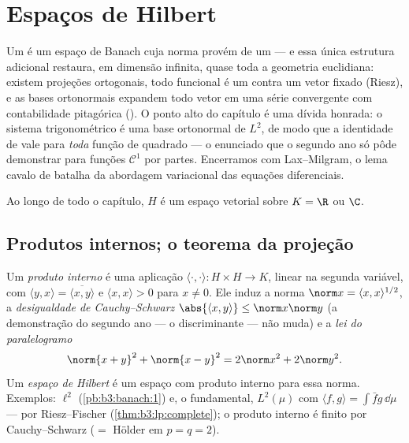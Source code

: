 \chapter{Espaços de Hilbert}\label{ch:b3:hilbert}

Um  é um espaço de Banach cuja norma provém de um
 --- e essa única estrutura adicional restaura, em
dimensão infinita, quase toda a geometria euclidiana: existem projeções
ortogonais, todo funcional  é um  contra um
vetor fixado (Riesz), e as bases ortonormais expandem todo vetor em uma
série convergente com contabilidade pitagórica (). O ponto alto
do capítulo é uma dívida honrada: o sistema trigonométrico é uma base
ortonormal de $L^2$, de modo que a identidade de  vale para
\emph{toda} função de quadrado  --- o enunciado que o segundo
ano só pôde demonstrar para funções $\mathcal C^1$ por partes. Encerramos com
Lax--Milgram, o lema cavalo de batalha da abordagem variacional das
equações diferenciais.

Ao longo de todo o capítulo, $H$ é um espaço vetorial sobre
$K = \R$ ou $\C$.

\section{Produtos internos; o teorema da projeção}

\begin{definition}\label{def:b3:hilbert:inner}
Um \emph{produto interno} é uma aplicação $\langle
\cdot,\cdot\rangle \colon H\times H \to K$,
linear na segunda variável, com $\langle y, x\rangle =
\overline{\langle x, y\rangle}$ e $\langle x, x\rangle > 0$ para $x \neq 0$. Ele induz a norma
$\norm x = \langle x,
x\rangle^{1/2}$, a \emph{desigualdade de Cauchy--Schwarz} $\abs{\langle x, y\rangle} \leq \norm x\norm y$ (a demonstração do
segundo ano --- o discriminante --- não muda) e a \emph{lei do
paralelogramo}
\[
\norm{x + y}^2 + \norm{x - y}^2 = 2\norm x^2 + 2\norm y^2 .
\]
Um \emph{espaço de Hilbert} é um espaço com
produto interno  para essa norma. Exemplos: $\ell^2$
(\cref{pb:b3:banach:1}) e, o fundamental, $L^2(\mu)$ com $\langle f, g\rangle = \int\bar fg\,\dd\mu$ ---  por
Riesz--Fischer (\cref{thm:b3:lp:complete}); o produto interno é finito por
Cauchy--Schwarz ($= $ Hölder em $p = q = 2$).
\end{definition}

